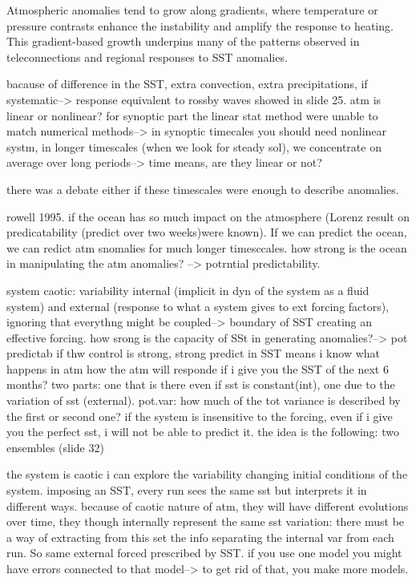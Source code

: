 Atmospheric anomalies tend to grow along gradients, where temperature or pressure contrasts enhance the instability and amplify the response to heating. This gradient-based growth underpins many of the patterns observed in teleconnections and regional responses to SST anomalies.

bacause of difference in the SST, extra convection, extra precipitations, if systematic--> response equivalent to rossby waves showed in slide 25.
atm is linear or nonlinear? for synoptic part the linear stat method were unable to match numerical methods--> in synoptic timecales you should need nonlinear systm, in longer timescales (when we look for steady sol), we concentrate on average over long periods--> time means, are they linear or not?

there was a debate either if these timescales were enough to describe anomalies.

rowell 1995. if the ocean has so much impact on the atmosphere (Lorenz result on predicatability (predict over two weeks)were known). If we can predict the ocean, we can redict atm snomalies for much longer timesccales. how strong is the ocean in manipulating the atm anomalies? --> potrntial predictability.


system caotic: variability internal (implicit in dyn of the system as a fluid system) and external (response to what a system gives to ext forcing factors), ignoring that everythng might be coupled--> boundary of SST creating an effective forcing. how srong is the capacity of SSt in generating anomalies?--> pot predictab
if thw control is strong, strong predict  in SST means i know what happens in atm
how the atm will responde if i give you the SST of the next 6 months? two parts: one that is there even if sst is constant(int), one due to the variation of sst (external).
pot.var: how much of the tot variance is described by the first or second one? if the system is insensitive to the forcing, even if i give you the perfect sst, i will not be able to predict it. the idea is the following: two ensembles (slide 32)


the system is caotic i can explore the variability changing initial conditions of the system. imposing an SST, every run sees the same sst but interprets it in different ways. because of caotic nature of atm, they will have different evolutions over time, they though internally represent the same sst variation: there must be a way of extracting from this set the info separating the internal var from each run. So same external forced prescribed by SST. if you use one model you might have errors connected to that model--> to get rid of that, you make more models.

